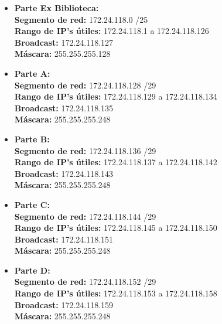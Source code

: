 \begin{itemize}[leftmargin=*]
    \item \textbf{Parte Ex Biblioteca:} \\
    \textbf{Segmento de red:} 172.24.118.0 /25 \\
    \textbf{Rango de IP's útiles:} 172.24.118.1 a 172.24.118.126 \\
    \textbf{Broadcast:} 172.24.118.127 \\
    \textbf{Máscara:} 255.255.255.128 
    \vspace{5pt}

    \item \textbf{Parte A:} \\
    \textbf{Segmento de red:} 172.24.118.128 /29 \\
    \textbf{Rango de IP's útiles:} 172.24.118.129 a 172.24.118.134 \\
    \textbf{Broadcast:} 172.24.118.135 \\
    \textbf{Máscara:} 255.255.255.248 
    \vspace{5pt}

    \item \textbf{Parte B:} \\
    \textbf{Segmento de red:} 172.24.118.136 /29 \\
    \textbf{Rango de IP's útiles:} 172.24.118.137 a 172.24.118.142 \\
    \textbf{Broadcast:} 172.24.118.143 \\
    \textbf{Máscara:} 255.255.255.248 
    \vspace{5pt}

    \item \textbf{Parte C:} \\
    \textbf{Segmento de red:} 172.24.118.144 /29 \\
    \textbf{Rango de IP's útiles:} 172.24.118.145 a 172.24.118.150 \\
    \textbf{Broadcast:} 172.24.118.151 \\
    \textbf{Máscara:} 255.255.255.248 
    \vspace{5pt}

    \item \textbf{Parte D:} \\
    \textbf{Segmento de red:} 172.24.118.152 /29 \\
    \textbf{Rango de IP's útiles:} 172.24.118.153 a 172.24.118.158 \\
    \textbf{Broadcast:} 172.24.118.159 \\
    \textbf{Máscara:} 255.255.255.248 
    \vspace{5pt}


\end{itemize}
